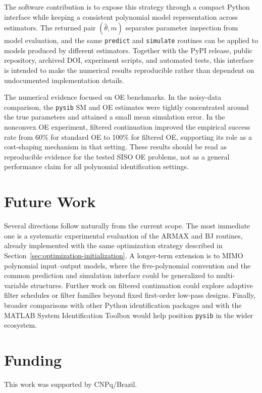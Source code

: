 \documentclass{ifacconf}
\begin{document}
The software contribution is to expose this strategy through a compact Python
interface while keeping a consistent polynomial model representation across
estimators.  The returned pair \((\hat\theta,m)\) separates parameter inspection
from model evaluation, and the same \texttt{predict} and \texttt{simulate}
routines can be applied to models produced by different estimators.  Together
with the PyPI release, public repository, archived DOI, experiment scripts, and
automated tests, this interface is intended to make the numerical results
reproducible rather than dependent on undocumented implementation details.

The numerical evidence focused on OE benchmarks.  In the noisy-data comparison,
the \texttt{pysib} SM and OE estimates were tightly concentrated around the true
parameters and attained a small mean simulation error.  In the nonconvex OE
experiment, filtered continuation improved the empirical success rate from 60\%
for standard OE to 100\% for filtered OE, supporting its role as a cost-shaping
mechanism in that setting.  These results should be read as reproducible
evidence for the tested SISO OE problems, not as a general performance claim for
all polynomial identification settings.

\section*{Future Work}

Several directions follow naturally from the current scope.  The most immediate
one is a systematic experimental evaluation of the ARMAX and BJ routines, already
implemented with the same optimization strategy described in
Section~\ref{sec:optimization-initialization}.  A longer-term extension is to
MIMO polynomial input--output models, where the five-polynomial convention and
the common prediction and simulation interface could be generalized to
multi-variable structures.  Further work on filtered continuation could explore
adaptive filter schedules or filter families beyond fixed first-order low-pass
designs.  Finally, broader comparisons with other Python
identification packages and with the MATLAB System Identification Toolbox would
help position \texttt{pysib} in the wider ecosystem.

\section*{Funding}

This work was supported by CNPq/Brazil.
\end{document}
